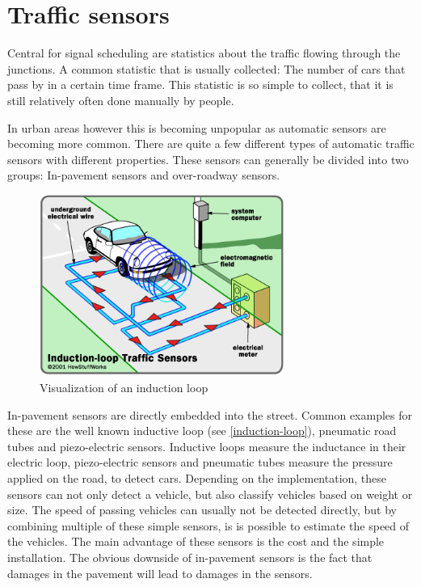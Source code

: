 \section{Traffic sensors}
\label{trafficSensors}

Central for signal scheduling are statistics about the traffic flowing through the junctions. A common statistic that is usually collected: The number of cars that pass by in a certain time frame. This statistic is so simple to collect, that it is still relatively often done manually by people.

In urban areas however this is becoming unpopular as automatic sensors are becoming more common. There are quite a few different types of automatic traffic sensors with different properties. These sensors can generally be divided into two groups: In-pavement sensors and over-roadway sensors.

\begin{figure}[ht]
	\centering
	\includegraphics[width=8cm]{figures/induction-loop}
	\caption{Visualization of an induction loop}
	\label{induction-loop}
\end{figure}

In-pavement sensors are directly embedded into the street. Common examples for these are the well known inductive loop (see \autoref{induction-loop}), pneumatic road tubes and piezo-electric sensors. Inductive loops measure the inductance in their electric loop, piezo-electric sensors and pneumatic tubes measure the pressure applied on the road, to detect cars. Depending on the implementation, these sensors can not only detect a vehicle, but also classify vehicles based on weight or size. The speed of passing vehicles can usually not be detected directly, but by combining multiple of these simple sensors, is is possible to estimate the speed of the vehicles.
The main advantage of these sensors is the cost and the simple installation. The obvious downside of in-pavement sensors is the fact that damages in the pavement will lead to damages in the sensors.


